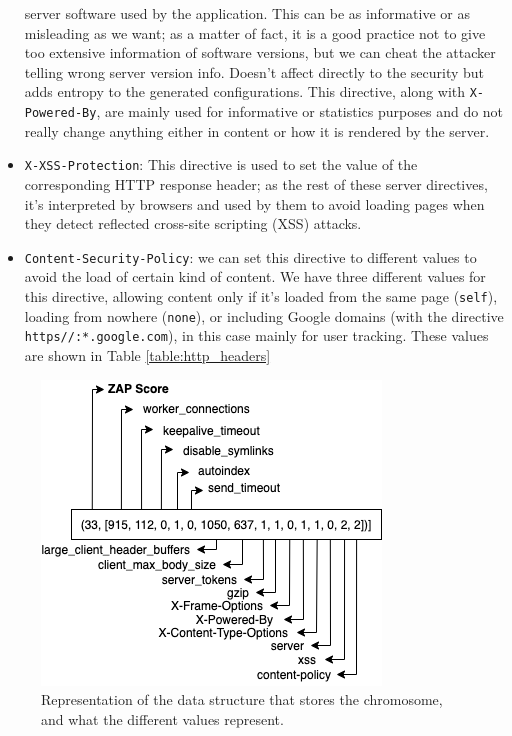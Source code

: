 \documentclass[sigconf]{acmart}
\begin{document}
\begin{itemize}
server software used by the application. This can be as informative or
as misleading as we want; as a matter of fact, it is a good practice
not to give too
extensive information of software versions, but we can cheat the
attacker telling wrong server version info. Doesn't affect directly to
the security but adds entropy to the generated configurations. This
directive, along with {\tt X-Powered-By}, are mainly used for
informative or statistics purposes and do not really change anything
either in content or how it is rendered by the server.
\item
\texttt{X-XSS-Protection}: This directive is used to set the value of
the corresponding HTTP response header; as the rest of these server
directives, it's interpreted by browsers and used by them to avoid
loading pages when they detect reflected cross-site
scripting (XSS) attacks. %
\item
\texttt{Content-Security-Policy}: we can set this directive to
different values to avoid the load of certain kind of content. We have
three different values for this directive, allowing content only if
it's loaded from the same page ({\tt self}), loading from nowhere
({\tt none}), or including Google domains (with the directive {\tt https//:*.google.com}), in
this case mainly for user tracking. These values are shown in Table \ref{table:http_headers}
\end{itemize}
%
\begin{figure}[h!tb]

  \includegraphics[width=0.95\columnwidth]{chromosome-diagram}
  \caption{Representation of the data structure that stores the
    chromosome, and what the different values represent.}
  \label{fig:chromosome}
\end{figure}
\end{document}
